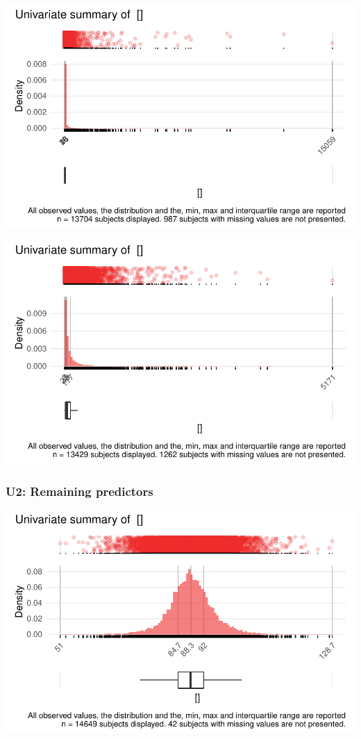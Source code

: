 \documentclass[
  letterpaper,
  DIV=11,
  numbers=noendperiod]{scrreport}
\begin{document}
\includegraphics{./Bact_univar_files/figure-pdf/uni03-5.pdf}

\includegraphics{./Bact_univar_files/figure-pdf/uni03-6.pdf}

\hypertarget{u2-remaining-predictors}{%
\subsubsection{U2: Remaining predictors}\label{u2-remaining-predictors}}

\includegraphics{./Bact_univar_files/figure-pdf/uni04-1.pdf}
\end{document}
